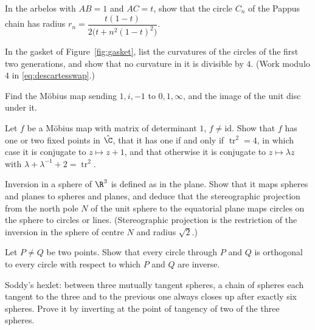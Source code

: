 \begin{exercise}[$\star\star$]\label{ex:pappusradius}
In the arbelos with $AB=1$ and $AC=t$, show that the circle $C_n$ of the Pappus chain has radius $r_n=\dfrac{t(1-t)}{2\bigl(t+n^2(1-t)^2\bigr)}$.
\end{exercise}

\begin{exercise}[$\star$]\label{ex:gasketroot}
In the gasket of Figure~\ref{fig:gasket}, list the curvatures of the circles of the first two generations, and show that no curvature in it
is divisible by $4$. (Work modulo $4$ in \eqref{eq:descartesswap}.)
\end{exercise}

\begin{exercise}[$\star$]\label{ex:mobius3}
Find the M\"obius map sending $1,i,-1$ to $0,1,\infty$, and the image of the unit disc under it.
\end{exercise}

\begin{exercise}[$\star\star$]\label{ex:trace}
Let $f$ be a M\"obius map with matrix of determinant $1$, $f\ne\mathrm{id}$. Show that $f$ has one or two fixed points in $\hat{\C}$, that it has one if
and only if $\operatorname{tr}^2=4$, in which case it is conjugate to $z\mapsto z+1$, and that otherwise it is conjugate to $z\mapsto\lambda z$ with
$\lambda+\lambda^{-1}+2=\operatorname{tr}^2$.
\end{exercise}

\begin{exercise}[$\star\star$]\label{ex:stereo}
Inversion in a sphere of $\R^3$ is defined as in the plane. Show that it maps spheres and planes to spheres and planes, and deduce that the
stereographic projection from the north pole $N$ of the unit sphere to the equatorial plane maps circles on the sphere to circles or lines.
(Stereographic projection is the restriction of the inversion in the sphere of centre $N$ and radius $\sqrt2$.)
\end{exercise}

\begin{exercise}[$\star$]\label{ex:orthcircles}
Let $P\ne Q$ be two points. Show that every circle through $P$ and $Q$ is orthogonal to every circle with respect to which $P$ and $Q$ are
inverse.
\end{exercise}

\begin{exercise}[$\star\star\star$]\label{ex:hexlet}
Soddy's hexlet: between three mutually tangent spheres, a chain of spheres each tangent to the three and to the previous one always closes
up after exactly six spheres. Prove it by inverting at the point of tangency of two of the three spheres.
\end{exercise}

